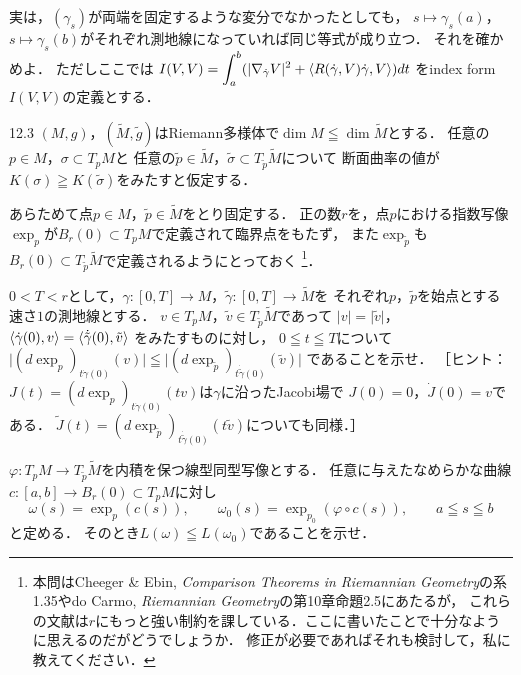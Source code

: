 \documentclass[uplatex,dvipdfmx,fontsize=12pt,jafontsize=11pt,line_length=42zw,number_of_lines=36,hanging_punctuation]{jlreq}
\newcommand{\abs}[1]{\lvert#1\rvert}
\begin{document}
\begin{enumerate-problems}
		実は，$(\gamma_s)$が両端を固定するような変分でなかったとしても，
		$s\mapsto\gamma_s(a)$，$s\mapsto\gamma_s(b)$がそれぞれ測地線になっていれば同じ等式が成り立つ．
		それを確かめよ．
		ただしここでは
		$\displaystyle I(V,V)=\int_a^b(\abs{\nabla_{\dot{\gamma}}V}^2+\braket{R(\dot{\gamma},V)\dot{\gamma},V})dt$
		をindex form $I(V,V)$の定義とする．
	\clearpage
	\item[12.3]
		$(M,g)$，$(\tilde{M},\tilde{g})$はRiemann多様体で$\dim M\leqq \dim\tilde{M}$とする．
		任意の$p\in M$，$\sigma\subset T_pM$と
		任意の$\tilde{p}\in\tilde{M}$，$\tilde{\sigma}\subset T_{\tilde{p}}\tilde{M}$について
		断面曲率の値が$K(\sigma)\geqq K(\tilde{\sigma})$をみたすと仮定する．

		あらためて点$p\in M$，$\tilde{p}\in\tilde{M}$をとり固定する．
		正の数$r$を，点$p$における指数写像$\exp_p$が$B_r(0)\subset T_pM$で定義されて臨界点をもたず，
		また$\exp_{\tilde{p}}$も$B_r(0)\subset T_{\tilde{p}}\tilde{M}$で定義されるようにとっておく
		\footnote{本問はCheeger \& Ebin, \textit{Comparison Theorems
		in Riemannian Geometry}の系1.35やdo Carmo, \textit{Riemannian Geometry}の第10章命題2.5にあたるが，
		これらの文献は$r$にもっと強い制約を課している．ここに書いたことで十分なように思えるのだがどうでしょうか．
		修正が必要であればそれも検討して，私に教えてください．}．
		\begin{enumerate-subproblems}
			\item
				$0<T<r$として，$\gamma\colon[0,T]\to M$，$\tilde{\gamma}\colon[0,T]\to\tilde{M}$を
				それぞれ$p$，$\tilde{p}$を始点とする速さ$1$の測地線とする．
				$v\in T_pM$，$\tilde{v}\in T_{\tilde{p}}\tilde{M}$であって
				$\abs{v}=\abs{\tilde{v}}$，
				$\braket{\dot{\gamma}(0),v}=\braket{\dot{\tilde{\gamma}}(0),\tilde{v}}$
				をみたすものに対し，
				$0\leqq t\leqq T$について
				$\abs{(d\exp_p)_{t\dot{\gamma}(0)}(v)}\leqq\abs{(d\exp_{\tilde{p}})_{t\dot{\tilde{\gamma}}(0)}(\tilde{v})}$
				であることを示せ．
				［ヒント：$J(t)=(d\exp_p)_{t\dot{\gamma}(0)}(tv)$は$\gamma$に沿ったJacobi場で
				$J(0)=0$，$\dot{J}(0)=v$である．
				$\tilde{J}(t)=(d\exp_{\tilde{p}})_{t\dot{\tilde{\gamma}}(0)}(t\tilde{v})$についても同様．］
			\item
				$\varphi\colon T_pM\to T_{\tilde{p}}\tilde{M}$を内積を保つ線型同型写像とする．
				任意に与えたなめらかな曲線$c\colon[a,b]\to B_r(0)\subset T_pM$に対し
				\begin{equation}
					\omega(s)=\exp_p(c(s)),\qquad
					\omega_0(s)=\exp_{p_0}(\varphi\circ c(s)),\qquad
					a\leqq s\leqq b
				\end{equation}
				と定める．
				そのとき$L(\omega)\leqq L(\omega_0)$であることを示せ．
		\end{enumerate-subproblems}


\end{enumerate-problems}
\end{document}

